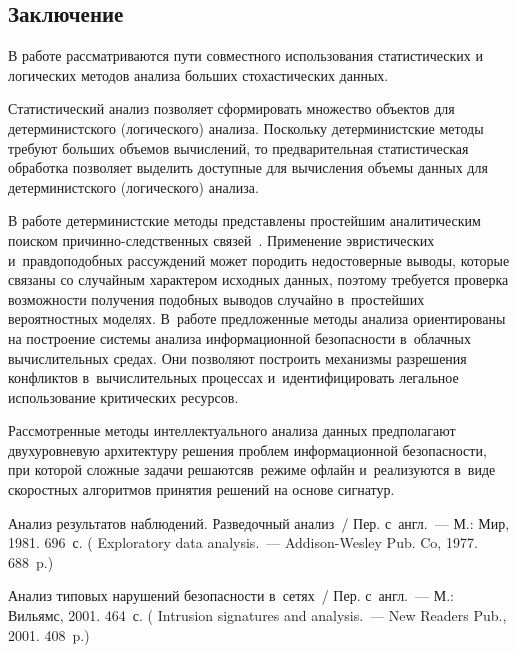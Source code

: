 \begin{multicols}{2}
\vspace*{-8pt}
  
\section{Заключение}

  В работе рассматриваются пути совместного использования статистических 
и логических методов анализа больших стохастических данных. 
  
  Статистический анализ позволяет сформировать множество объектов для 
детерминистского (логического) анализа. Поскольку детерминистские методы 
требуют больших объемов вычислений, то предварительная статистическая 
обработка позволяет выделить доступные для вычисления объемы данных для 
детерминистского (логического) анализа. 
  
  В работе детерминистские методы представлены простейшим аналитическим 
поиском при\-чин\-но-след\-ст\-вен\-ных связей~\cite{6-gru}. Применение 
эвристических и~правдоподобных рассуждений может породить недостоверные 
выводы, которые связаны со случайным характером исходных данных, 
поэтому требуется проверка возможности получения подобных выводов 
случайно в~простейших вероятностных моделях. В~работе предложенные 
методы анализа ориентированы на построение системы анализа 
информационной безопасности в~облачных вычислительных средах. Они 
позволяют построить механизмы разрешения конфликтов в~вычислительных 
процессах и~идентифицировать легальное использование критических ресурсов. 
  
  Рассмотренные методы интеллектуального анализа данных предполагают 
двухуровневую архитектуру решения проблем информационной без\-опас\-ности, 
при которой сложные задачи решаются\linebreak в~режиме офлайн и~реализуются в~виде 
скоростных алгоритмов принятия решений на основе сигнатур.

\vspace*{-8pt}
  
{\small\frenchspacing
 {%
 \begin{thebibliography}{99}
 Анализ результатов наблюдений. Разведочный анализ~/ Пер. 
с~англ.~--- М.: Мир, 1981. 696~с. ( Exploratory data analysis.~--- 
Addison-Wesley Pub. Co, 1977. 688~p.)

 Анализ типовых 
нарушений безопасности в~сетях~/ Пер. с~англ.~--- М.: Вильямс, 2001. 464~с. 
( Intrusion signatures and 
analysis.~--- New Readers Pub., 2001. 408~p.)


\end{thebibliography}}}
\end{multicols}
